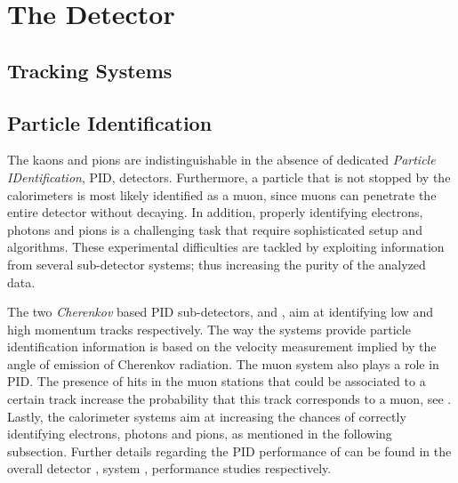 
\chapter{The \lhcb Detector}
\label{lhcb_detector}


\section{Tracking Systems}
\label{det_tracking}


\section{Particle Identification}
\label{det_pid}

The kaons and pions are indistinguishable in the absence of dedicated {\it Particle IDentification}, PID, detectors.
Furthermore, a particle that is not stopped by the calorimeters is most likely identified as a muon,
since muons can penetrate the entire \lhcb detector without decaying. In addition, properly identifying
electrons, photons and pions is a challenging task that require sophisticated setup and algorithms.
These experimental difficulties are tackled by exploiting information from several sub-detector systems;
thus increasing the purity of the analyzed data.

The two {\it Cherenkov} based PID sub-detectors, \richone and \richtwo, aim at identifying low and
high momentum tracks respectively. The way the \rich systems provide particle identification information is
based on the velocity measurement implied by the angle of emission of Cherenkov radiation.
The muon system also plays a role in PID. The presence of hits in the muon stations that
could be associated to a certain track increase the probability that this track corresponds to a muon,
see . Lastly, the calorimeter systems aim at increasing the chances of correctly
identifying electrons, photons and pions, as mentioned in the following subsection.
Further details regarding the PID performance of \lhcb can be found in the overall detector \cite{Aaij:2014jba},
\rich system \cite{Adinolfi:1495721}, \muonID \cite{Archilli:1553139} performance studies respectively.



